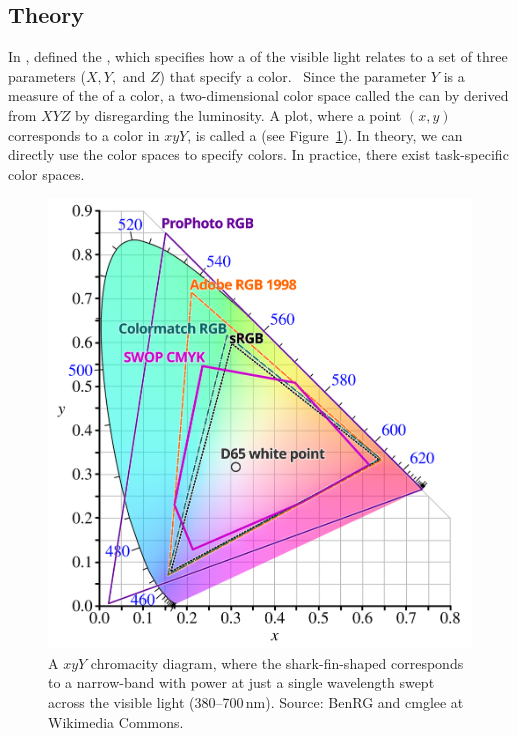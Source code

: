 \subsection{Theory}
In \citeyear{cie32},  defined the , which specifies how a
 of the visible light relates to a set of three parameters ($X,
Y,$ and $Z$) that specify a color.~\cite{cie32}
Since the parameter $Y$ is a measure of the
 of a color, a two-dimensional color space called the
 can by derived
from  $XYZ$ by disregarding the luminosity.
A plot, where a point $(x, y)$ corresponds to a color in  $xyY$,
is called a  (see Figure~\ref{fig:chromacity-diagram}).
In theory, we can directly use the  color spaces to specify
colors. In practice, there exist task-specific color spaces.

\begin{figure}
  \includegraphics[width=\textwidth]{examples/03/CIExy1931}
  \caption{A  $xyY$ chromacity diagram, where the shark-fin-shaped
    \protect{} corresponds to a narrow-band 
    with power at just a single wavelength swept across the visible light
    (380–700\,nm). Source: BenRG and cmglee at Wikimedia Commons.}
  \label{fig:chromacity-diagram}
\end{figure}

